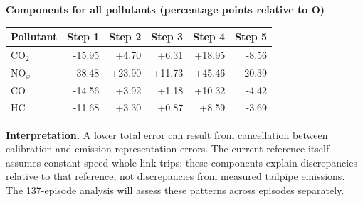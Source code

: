
\vspace{9pt}\textbf{Components for all pollutants (percentage points relative to O)}\par
\renewcommand{\arraystretch}{1.4}
\begin{tabular*}{\linewidth}{@{\extracolsep{\fill}}lrrrrr@{}}\toprule
Pollutant & Step 1 & Step 2 & Step 3 & Step 4 & Step 5\\\midrule
CO$_2$ & -15.95 & +4.70 & +6.31 & +18.95 & -8.56 \\
NO$_x$ & -38.48 & +23.90 & +11.73 & +45.46 & -20.39 \\
CO & -14.56 & +3.92 & +1.18 & +10.32 & -4.42 \\
HC & -11.68 & +3.30 & +0.87 & +8.59 & -3.69 \\
\bottomrule\end{tabular*}
\par\smallskip
\textbf{Interpretation.} A lower total error can result from cancellation between calibration and emission-representation errors.
The current reference itself assumes constant-speed whole-link trips; these components explain discrepancies relative to that reference,
not discrepancies from measured tailpipe emissions. The 137-episode analysis will assess these patterns across episodes separately.
